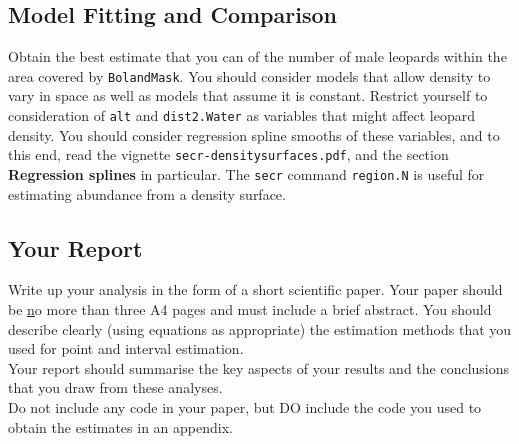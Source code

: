 \subsection*{Model Fitting and Comparison}

Obtain the best estimate that you can of the number of male leopards within the area covered by \verb|BolandMask|. You should consider models that allow density to vary in space as well as models that assume it is constant. Restrict yourself to consideration of \verb|alt| and \verb|dist2.Water| as variables that might affect leopard density. You should consider regression spline smooths of these variables, and to this end, read the vignette \verb|secr-densitysurfaces.pdf|, and the section \textbf{Regression splines} in particular. The \verb|secr| command \verb|region.N| is useful for estimating abundance from a density surface.


\subsection*{Your Report}

Write up your analysis in the form of a short scientific paper. Your paper should be {\underline no more than three A4 pages} and must include a brief abstract. You should describe clearly (using equations as appropriate) the estimation methods that you used for point and interval estimation. \\

Your report should summarise the key aspects of your results and the conclusions that you draw from these analyses. \\

Do not include any code in your paper, but DO include the code you used to obtain the estimates in an appendix. 



